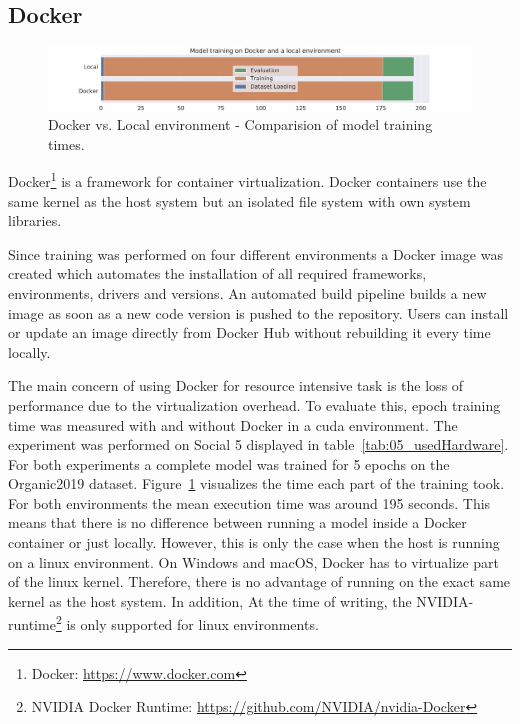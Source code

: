\subsection{Docker}
\begin{figure}[ht]
	\centering
	\includegraphics[width=\textwidth]{figures/05_setup/05_dockerExecution}
	\caption{Docker vs. Local environment - Comparision of model training times.}
	\label{fig:05_dockerExecution}
\end{figure}

Docker\footnote{Docker: \url{https://www.docker.com}} is a framework for container virtualization. Docker containers use the same kernel as the host system but an isolated file system with own system libraries. 
\medskip

Since training was performed on four different environments a Docker image was created which automates the installation of all required frameworks, environments, drivers and versions. An automated build pipeline builds a new image as soon as a new code version is pushed to the repository. Users can install or update an image directly from Docker Hub without rebuilding it every time locally.
\medskip

The main concern of using Docker for resource intensive task is the loss of performance due to the virtualization overhead. To evaluate this, epoch training time was measured with and without Docker in a \gls{cuda} environment. The experiment was performed on Social 5 displayed in table~\ref{tab:05_usedHardware}. For both experiments a complete model was trained for 5 epochs on the Organic2019 dataset. Figure~\ref{fig:05_dockerExecution} visualizes the time each part of the training took. For both environments the mean execution time was around 195 seconds. This means that there is no difference between running a model inside a Docker container or just locally. However, this is only the case when the host is running on a linux environment. On Windows and macOS, Docker has to virtualize part of the linux kernel. Therefore, there is no advantage of running on the exact same kernel as the host system. In addition, At the time of writing, the NVIDIA-runtime\footnote{NVIDIA Docker Runtime: \url{https://github.com/NVIDIA/nvidia-Docker}} is only supported for linux environments.






